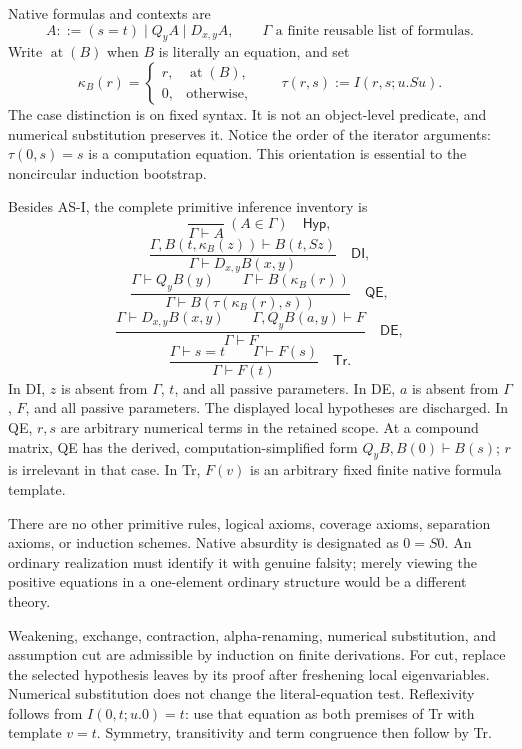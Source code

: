 Native formulas and contexts are
\[
 A::=(s=t)\mid Q_yA\mid D_{x,y}A,
 \qquad\Gamma\text{ a finite reusable list of formulas}.
\]
Write $\operatorname{at}(B)$ when $B$ is literally an equation, and set
\[
 \kappa_B(r)=
 \begin{cases}r,&\operatorname{at}(B),\\0,&\text{otherwise},\end{cases}
 \qquad
 \tau(r,s):=I(r,s;u.Su).
 \tag{AS-kappa}
\]
The case distinction is on fixed syntax. It is not an object-level
predicate, and numerical substitution preserves it. Notice the order
of the iterator arguments: $\tau(0,s)=s$ is a computation equation.
This orientation is essential to the noncircular induction bootstrap.

Besides AS-I, the complete primitive inference inventory is
\[
 \frac{}{\Gamma\vdash A}\ (A\in\Gamma)
 \quad\mathsf{Hyp},
\]
\[
 \frac{\Gamma,B(t,\kappa_B(z))\vdash B(t,Sz)}
      {\Gamma\vdash D_{x,y}B(x,y)}
 \quad\mathsf{DI},
 \tag{AS-DI}
\]
\[
 \frac{\Gamma\vdash Q_yB(y)\qquad
       \Gamma\vdash B(\kappa_B(r))}
      {\Gamma\vdash B(\tau(\kappa_B(r),s))}
 \quad\mathsf{QE},
 \tag{AS-QE}
\]
\[
 \frac{\Gamma\vdash D_{x,y}B(x,y)\qquad
       \Gamma,Q_yB(a,y)\vdash F}
      {\Gamma\vdash F}
 \quad\mathsf{DE},
\]
\[
 \frac{\Gamma\vdash s=t\qquad\Gamma\vdash F(s)}
      {\Gamma\vdash F(t)}
 \quad\mathsf{Tr}.
\]
In DI, $z$ is absent from $\Gamma$, $t$, and all passive parameters.
In DE, $a$ is absent from $\Gamma$, $F$, and all passive parameters.
The displayed local hypotheses are discharged. In QE, $r,s$ are
arbitrary numerical terms in the retained scope. At a compound matrix,
QE has the derived, computation-simplified form
$Q_yB,B(0)\vdash B(s)$; $r$ is irrelevant in that case.
In Tr, $F(v)$ is an arbitrary fixed finite native formula template.

There are no other primitive rules, logical axioms, coverage axioms,
separation axioms, or induction schemes. Native absurdity is designated
as $0=S0$. An ordinary realization must identify it with genuine
falsity; merely viewing the positive equations in a one-element
ordinary structure would be a different theory.

Weakening, exchange, contraction, alpha-renaming, numerical
substitution, and assumption cut are admissible by induction on finite
derivations. For cut, replace the selected hypothesis leaves by its
proof after freshening local eigenvariables. Numerical substitution
does not change the literal-equation test. Reflexivity follows from
$I(0,t;u.0)=t$: use that equation as both premises of Tr with template
$v=t$. Symmetry, transitivity and term congruence then follow by Tr.

